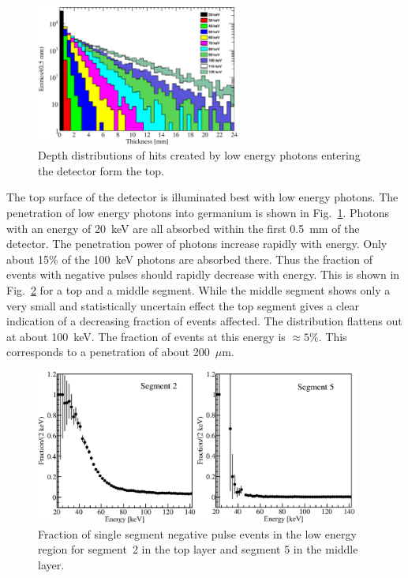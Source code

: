 \begin{figure}[tphb]
\centering
\includegraphics[width=0.6\textwidth]{gDepth}
\caption{Depth distributions of hits created by low energy photons
entering the detector form the top.}
\label{fig:np:gdep}
\end{figure}

The top surface of the detector is illuminated best with low energy
photons. The penetration of low energy photons into germanium is shown
in Fig.~\ref{fig:np:gdep}. Photons with an energy of 20~keV are all
absorbed within the first 0.5~mm of the detector. The penetration
power of photons increase rapidly with energy. Only about 15\% of the
100~keV photons are absorbed there. Thus the fraction of events with
negative pulses should rapidly decrease with energy. This is shown in
Fig.~\ref{fig:np:fraclow} for a top and a middle segment. While the
middle segment shows only a very small and statistically uncertain
effect the top segment gives a clear indication of a decreasing
fraction of events affected. The distribution flattens out at about
100~keV. The fraction of events at this energy is $\approx 5\%$. This
corresponds to a penetration of about 200~$\mu$m.

\begin{figure}[tphb]
\centering
\includegraphics[width=0.95\textwidth]{NegFraction20140}
\caption{Fraction of single segment negative pulse events in the low
energy region for segment~2 in the top layer and segment 5 in the
middle layer.}
\label{fig:np:fraclow}
\end{figure}

